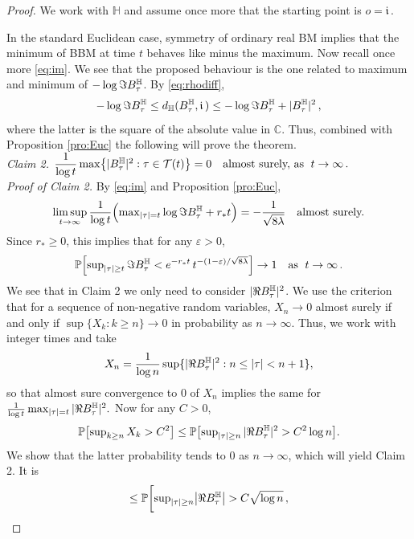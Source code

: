 \documentclass[12pt]{amsart}
\newcommand\BB{\textit{\textbf{B}}}
\newcommand\C{\mathbb C}
\newcommand\ep{\varepsilon}
\newcommand\HH{\mathbb H}
\newcommand\im{\mathfrak{i}\,}
\newcommand\Prob{\mathbb P}
\newcommand\ro{d}
\newcommand\T{\mathcal T}
\numberwithin{theorem}{section}
\theoremstyle{definition}
\begin{document}
\begin{proof}
We work with $\HH$ and assume once more that the starting point is $o=\im$.

In the standard Euclidean case, symmetry of ordinary real BM implies that the minimum 
of BBM at time $t$ behaves like minus the maximum. Now recall once more  \eqref{eq:im}. We see
that the proposed behaviour is the one related to maximum and minimum of 
$-\log \Im \BB_{\tau}^{\HH}$. 
By \eqref{eq:rhodiff},
$$
-\log \Im \BB_{\tau}^{\HH} \le \ro_{\HH}(\BB_{\tau}^{\HH},\im) \le -\log \Im \BB_{\tau}^{\HH} 
+ |\BB_{\tau}^{\HH}|^2\,, 
$$
where the latter is the square of the absolute value in $\C$. 
Thus, combined with Proposition \ref{pro:Euc} the following will prove the theorem.
\\[5pt]
\emph{Claim 2.} \hspace{.9cm}
$ 
\dfrac{1}{\log t}\max \bigl\{ |\BB_{\tau}^{\HH}|^2 : \tau \in \T(t) \bigr\} = 0
\quad \text{almost surely, as }\; t \to \infty\,.
$
\\[5pt]
\emph{Proof of Claim 2.}
By \eqref{eq:im} and Proposition \ref{pro:Euc}, 
$$
\limsup_{t \to \infty} 
\frac{1}{\log t}\Bigl(\max\nolimits_{|\tau|=t}\log \Im \BB_{\tau}^{\HH}  + r_*t\Bigr)
= -\frac{1}{\sqrt{8\lambda}}
\quad \text{almost surely.}
$$
Since $r_* \ge 0$, this implies that for any $\ep > 0$,
\begin{equation}\label{eq:Pto1}
 \Prob\Bigl[ \sup\nolimits_{|\tau| \ge t} \Im \BB_{\tau}^{\HH} < e^{-r_*t}\, t^{-(1-\ep)/\sqrt{8\lambda}}
             \Bigr] \to 1 \quad \text{as }\; t \to \infty\,.
\end{equation}
We see that in Claim 2 we only need to consider  $|\Re \BB_{\tau}^{\HH}|^2$. 
We use the criterion that for a sequence of non-negative random variables, $X_n \to 0$ almost surely 
if and only if $\sup \{ X_k : k \ge n \} \to 0$ in probability as $n \to \infty$.
Thus, we work with integer times and take
$$
X_n = \frac{1}{\log n}\sup \{ |\Re \BB_{\tau}^{\HH}|^2 : n \le |\tau| < n+1 \},
$$
so that almost sure convergence to $0$ of $X_n$ implies the same for  
$
\frac{1}{\log t}\max_{|\tau| = t} |\Re \BB_{\tau}^{\HH}|^2. 
$
Now for any $C > 0$, 
$$
\Prob\bigl[ \sup\nolimits_{k \ge n} X_k > C^2 \bigr] \le 
\Prob \bigl[ \sup\nolimits_{|\tau| \ge n} |\Re \BB_{\tau}^{\HH}|^2 > C^2 \log n\bigr].
$$
We show that the latter probability tends to $0$ as $n \to \infty$, which will 
yield Claim 2.
It is 
$$
\begin{aligned}
\le \Prob\biggl[ \sup\nolimits_{|\tau| \ge n} \bigl|\Re \BB_{\tau}^{\HH}\bigr| > C \sqrt{\log n}\,,

\end{aligned}$$
\end{proof}
\end{document}
